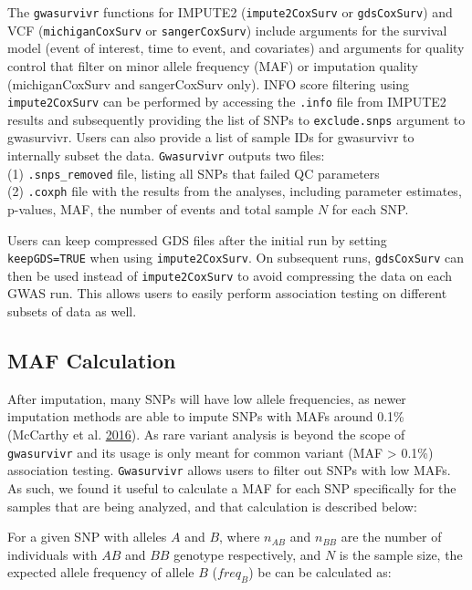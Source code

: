 \documentclass[]{DissertateOSU}
\begin{document}
The \texttt{gwasurvivr} functions for IMPUTE2 (\texttt{impute2CoxSurv}
or \texttt{gdsCoxSurv}) and VCF (\texttt{michiganCoxSurv} or
\texttt{sangerCoxSurv}) include arguments for the survival model (event
of interest, time to event, and covariates) and arguments for quality
control that filter on minor allele frequency (MAF) or imputation
quality (michiganCoxSurv and sangerCoxSurv only). INFO score filtering
using \texttt{impute2CoxSurv} can be performed by accessing the
\texttt{.info} file from IMPUTE2 results and subsequently providing the
list of SNPs to \texttt{exclude.snps} argument to gwasurvivr. Users can
also provide a list of sample IDs for gwasurvivr to internally subset
the data. \texttt{Gwasurvivr} outputs two files:\\
(1) \texttt{.snps\_removed} file, listing all SNPs that failed QC
parameters\\
(2) \texttt{.coxph} file with the results from the analyses, including
parameter estimates, p-values, MAF, the number of events and total
sample \(N\) for each SNP.

Users can keep compressed GDS files after the initial run by setting
\texttt{keepGDS=TRUE} when using \texttt{impute2CoxSurv}. On subsequent
runs, \texttt{gdsCoxSurv} can then be used instead of
\texttt{impute2CoxSurv} to avoid compressing the data on each GWAS run.
This allows users to easily perform association testing on different
subsets of data as well.

\subsection{MAF Calculation}\label{maf-calculation}

After imputation, many SNPs will have low allele frequencies, as newer
imputation methods are able to impute SNPs with MAFs around 0.1\%
(McCarthy et al. \protect\hyperlink{ref-hrc}{2016}). As rare variant
analysis is beyond the scope of \texttt{gwasurvivr} and its usage is
only meant for common variant (MAF \textgreater{} 0.1\%) association
testing. \texttt{Gwasurvivr} allows users to filter out SNPs with low
MAFs. As such, we found it useful to calculate a MAF for each SNP
specifically for the samples that are being analyzed, and that
calculation is described below:

For a given SNP with alleles \(A\) and \(B\), where \(n_{AB}\) and
\(n_{BB}\) are the number of individuals with \(AB\) and \(BB\) genotype
respectively, and \(N\) is the sample size, the expected allele
frequency of allele \(B\) (\(freq_B\)) be can be calculated as:
\end{document}
